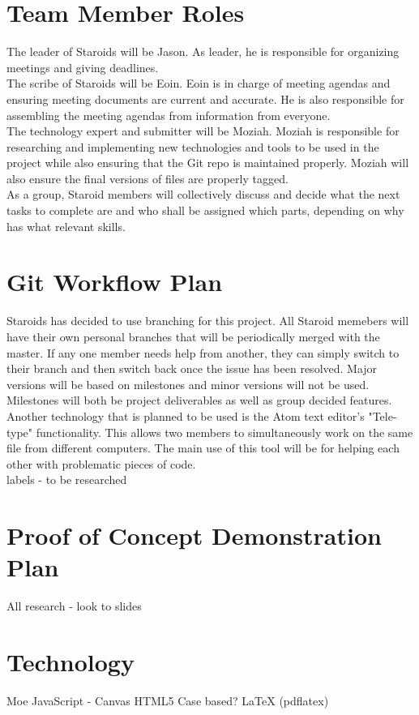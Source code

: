 \documentclass{article}
\begin{document}
\section{Team Member Roles}
The leader of Staroids will be Jason. As leader, he is responsible for organizing meetings and giving deadlines.\\
The scribe of Staroids will be Eoin. Eoin is in charge of meeting agendas and ensuring meeting documents are current and accurate. He is also responsible for assembling the meeting agendas from information from everyone.\\
The technology expert and submitter will be Moziah. Moziah is responsible for researching and implementing new technologies and tools to be used in the project while also ensuring that the Git repo is maintained properly. Moziah will also ensure the final versions of files are properly tagged.\\
As a group, Staroid members will collectively discuss and decide what the next tasks to complete are and who shall be assigned which parts, depending on why has what relevant skills.

\section{Git Workflow Plan}
Staroids has decided to use branching for this project. All Staroid memebers will have their own personal branches that will be periodically merged with the master. If any one member needs help from another, they can simply switch to their branch and then switch back once the issue has been resolved. Major versions will be based on milestones and minor versions will not be used. Milestones will both be project deliverables as well as group decided features. Another technology that is planned to be used is the Atom text editor's "Tele-type" functionality. This allows two members to simultaneously work on the same file from different computers. The main use of this tool will be for helping each other with problematic pieces of code.\\

labels - to be researched

\section{Proof of Concept Demonstration Plan}
All
research - look to slides

\section{Technology}
Moe
JavaScript - Canvas
HTML5
Case based?
LaTeX (pdflatex)
\end{document}
